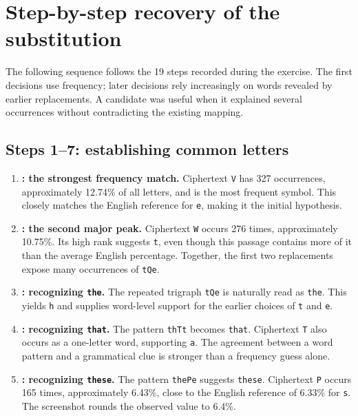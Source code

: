 \section{Step-by-step recovery of the substitution}
\label{sec:deductions}
The following sequence follows the 19 steps recorded during the exercise. The first decisions use frequency; later decisions rely increasingly on words revealed by earlier replacements. A candidate was useful when it explained several occurrences without contradicting the existing mapping.

\subsection{Steps 1--7: establishing common letters}
\begin{enumerate}
\item \textbf{: the strongest frequency match.} Ciphertext \texttt{V} has 327 occurrences, approximately 12.74\% of all letters, and is the most frequent symbol. This closely matches the English reference for \texttt{e}, making it the initial hypothesis.

\item \textbf{: the second major peak.} Ciphertext \texttt{W} occurs 276 times, approximately 10.75\%. Its high rank suggests \texttt{t}, even though this passage contains more of it than the average English percentage. Together, the first two replacements expose many occurrences of \texttt{tQe}.

\item \textbf{: recognizing \texttt{the}.} The repeated trigraph \texttt{tQe} is naturally read as \texttt{the}. This yields \texttt{h} and supplies word-level support for the earlier choices of \texttt{t} and \texttt{e}.

\item \textbf{: recognizing \texttt{that}.} The pattern \texttt{thTt} becomes \texttt{that}. Ciphertext \texttt{T} also occurs as a one-letter word, supporting \texttt{a}. The agreement between a word pattern and a grammatical clue is stronger than a frequency guess alone.

\item \textbf{: recognizing \texttt{these}.} The pattern \texttt{thePe} suggests \texttt{these}. Ciphertext \texttt{P} occurs 165 times, approximately 6.43\%, close to the English reference of 6.33\% for \texttt{s}. The screenshot rounds the observed value to 6.4\%.


\end{enumerate}
